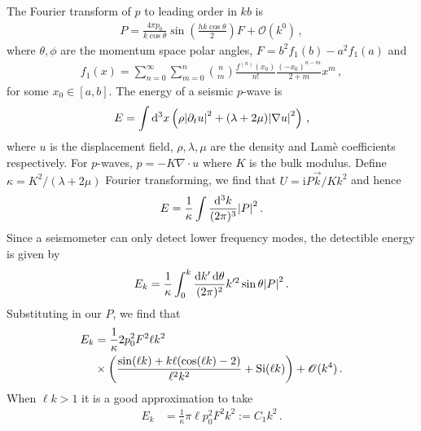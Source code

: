 \documentclass[prd,reprint,10pt,tightenlines]{revtex4-1}
\newcommand*\diff{\mathop{}\!\mathrm{d}}
\newcommand*\scr[1]{\mathscr{#1}}
\newcommand*\te[1]{\text{#1}}
\newcommand*\p[1]{\left(#1\right)}
\newcommand*\f[2]{\frac{#1}{#2}}
\newcommand*\I{\te{i}}
\begin{document}
The Fourier transform of $p$ to leading order in $kb$ is
\begin{align}
P = \f{4\pi p_0}{k\cos\theta}\sin\p{\f{h k\cos\theta}{2}}F+\scr O(k^0)\,,
\end{align}
where $\theta,\phi$ are the momentum space polar angles, $F = b^2f_1(b)-a^2f_1(a)$ and
\begin{align}
f_1(x) = \sum_{n=0}^\infty\sum_{m=0}^n\binom{n}{m}\f{f^{(n)}(x_0)}{n!}\f{(-x_0)^{n-m}}{2+m}x^{m}\,,
\end{align}
for some $x_0\in[a,b]$. The energy of a seismic $p$-wave is
\begin{align}
E = \int\diff^3 x\p{ \rho\abs{\partial_t u}^2+(\lambda+2\mu)\abs{\nabla u}^2}\,,
\end{align}
where $u$ is the displacement field, $\rho,\lambda,\mu$ are the density and Lam\`e coefficients respectively. For $p$-waves, $p = -K\nabla\cdot u$ where $K$ is the bulk modulus. Define $\kappa = K^2/(\lambda + 2\mu)$ Fourier transforming, we find that $U = \I P\vec k/K k^2$ and hence
\begin{align}
E =\f1\kappa\int\f{\diff^3 k}{(2\pi)^3}\abs{P}^2\,.
\end{align}
Since a seismometer can only detect lower frequency modes, the detectible energy is given by 
\begin{align}
E_k = \f1\kappa\int_0^k\f{\diff k'\diff\theta}{(2\pi)^2}k'^2\sin\theta\abs{P}^2\,.
\end{align}
Substituting in our $P$, we find that
\begin{align}
\notag E_k&=\f1\kappa 2p_0^2F^2\ell k^2\\\notag&\times\p{\f{\sin(\ell k)+k\ell(\cos(\ell k)-2)}{\ell^2 k^2}+\te{Si}(\ell k)}+\scr O(k^4)\,.
\end{align}
When $\ell k>1$ it is a good approximation to take
\begin{align}
E_k&=\f1\kappa \pi\ell p_0^2F^2 k^2:=C_1 k^2\,.
\end{align}
\end{document}
